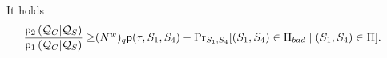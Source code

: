 \begin{lemma}
	\label{lemma:reduce-to-two-rounds}
	
	It holds
	\begin{align}
	\frac{\mathsf{p}_{2}\left(\mathcal{Q}_{C} | \mathcal{Q}_{S}\right)}{\mathsf{p}_{1}\left(\mathcal{Q}_{C} | \mathcal{Q}_{S}\right)}
	\geq  &  (N^w)_q{\mathsf{p}(\tau,S_1,S_4)}  - \operatorname{Pr}_{S_1,S_4}[(S_1,S_4) \in \emph{$\Pi_{bad}$}\mid (S_{1}, S_{4})\in\Pi].
	\label{eq:function-dependent-bound-on-ratio}
	\end{align}
%	
%	
%	
%	
%	
%	
\end{lemma}
